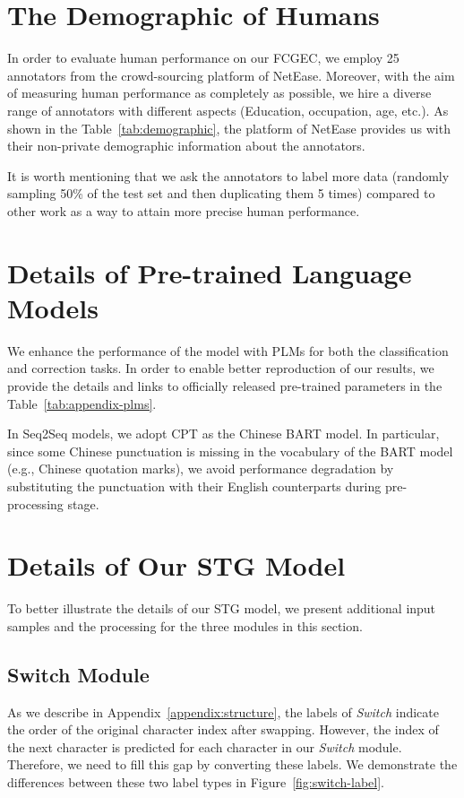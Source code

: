 \documentclass[11pt]{article}
\begin{document}
\section{The Demographic of Humans}
\label{appendix:demographic}

In order to evaluate human performance on our FCGEC, we employ 25 annotators from the crowd-sourcing platform of NetEase. Moreover, with the aim of measuring human performance as completely as possible, we hire a diverse range of annotators with different aspects (Education, occupation, age, etc.). As shown in the Table~\ref{tab:demographic}, the platform of NetEase provides us with their non-private demographic information about the annotators.


It is worth mentioning that we ask the annotators to label more data (randomly sampling 50\% of the test set and then duplicating them 5 times) compared to other work as a way to attain more precise human performance.


\section{Details of Pre-trained Language Models}
\label{appendix:appendix-plm}


We enhance the performance of the model with PLMs for both the classification and correction tasks. In order to enable better reproduction of our results, we provide the details and links to officially released pre-trained parameters in the Table~\ref{tab:appendix-plms}.

In Seq2Seq models, we adopt CPT as the Chinese BART model. In particular, since some Chinese punctuation is missing in the vocabulary of the BART model (e.g., Chinese quotation marks), we avoid performance degradation by substituting the punctuation with their English counterparts during pre-processing stage.

\section{Details of Our STG Model}
\label{appendix:stg-appendix}

To better illustrate the details of our STG model, we present additional input samples and the processing for the three modules in this section.

\subsection{Switch Module}
\label{appendix:switch}
As we describe in Appendix~\ref{appendix:structure}, the labels of \emph{Switch} indicate the order of the original character index after swapping. However, the index of the next character is predicted for each character in our \emph{Switch} module. Therefore, we need to fill this gap by converting these labels. We demonstrate the differences between these two label types in Figure~\ref{fig:switch-label}.
\end{document}
